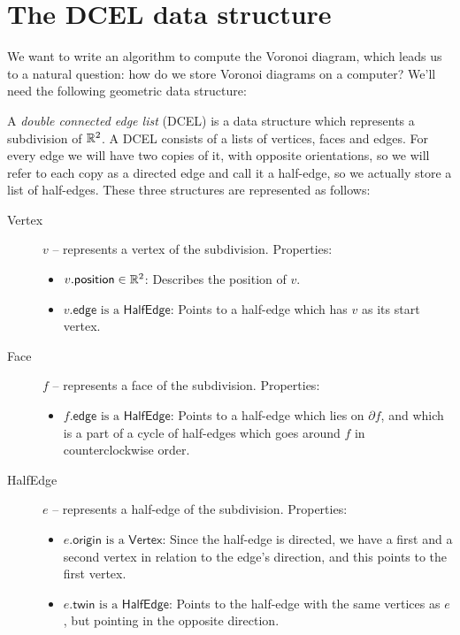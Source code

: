 %
%

\section{The DCEL data structure}
We want to write an algorithm to compute the Voronoi diagram, which leads us to a natural question: how do we store Voronoi diagrams on a computer?  We'll need the following geometric data structure:
\begin{defn}[DCEL] \label{defn:dcel}
A \emph{double connected edge list} (DCEL) is a data structure which represents a subdivision of $\mathbb{R}^2$. A DCEL consists of a lists of vertices, faces and edges. For every edge we will have two copies of it, with opposite orientations, so we will refer to each copy as a directed edge and call it a half-edge, so we actually store a list of half-edges. These three structures are represented as follows:
\begin{description}
  \item[\textsf{Vertex}] $v$ -- represents a vertex of the subdivision. Properties:
  \begin{itemize}
    \item $v.\textsf{position} \in \mathbb{R}^2$: Describes the position of $v$.
    \item $v.\textsf{edge} \text{ is a } \textsf{HalfEdge}$: Points to a half-edge which has $v$ as its start vertex.
  \end{itemize}
  \item[\textsf{Face}] $f$ -- represents a face of the subdivision. Properties:
  \begin{itemize}
    \item $f.\textsf{edge} \text{ is a } \textsf{HalfEdge}$: Points to a half-edge which lies on $\partial f$, and which is a part of a cycle of half-edges which goes around $f$ in counterclockwise order.
  \end{itemize}
  \item[\textsf{HalfEdge}] $e$ -- represents a half-edge of the subdivision. Properties:
  \begin{itemize}
    \item $e.\textsf{origin} \text{ is a } \textsf{Vertex}$: Since the half-edge is directed, we have a first and a second vertex in relation to the edge's direction, and this points to the first vertex.
    \item $e.\textsf{twin} \text{ is a } \textsf{HalfEdge}$: Points to the half-edge with the same vertices as $e$, but pointing in the opposite direction.

\end{itemize}
\end{description}
\end{defn}
